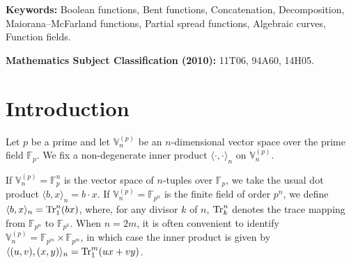 \documentclass[12pt]{article}
\theoremstyle{plain}
\theoremstyle{definition}
\newcommand{\V}{\mathbb{V}}
\newcommand{\Tr}{{\rm Tr}}
\begin{document}
	\begin{abstract}
		We study generalizations of two classical primary constructions of Boolean bent functions, namely the Maiorana--McFarland ($MM$) class and the (Desarguesian) partial spread ($\mathcal{PS}_{ap}$) class. 
		
		The construction of bent functions lying outside the completed $MM$ class has attracted considerable attention in recent years. 
		In this direction, we construct families of generalized Maiorana--McFarland bent functions that are not equivalent to any function in the classical $MM$ or $\mathcal{PS}_{ap}$ classes, and hence lie outside their completed classes.
		
		As a second contribution, we investigate the decomposition of generalized $\mathcal{PS}_{ap}$ functions. 
		We prove that when the degree is sufficiently small relative to the size of the underlying finite field, such functions do not, in general, admit a decomposition into bent or semibent functions. 
		Consequently, they cannot be obtained from known secondary constructions based on concatenation.
		
		Finally, we present a secondary construction of Boolean bent functions arising from the concatenation of components of vectorial generalized $\mathcal{PS}_{ap}$ functions.
		
		Our constructions and proofs rely on classical results concerning second-order derivatives of bent functions and their duals. In addition, we employ methods from the theory of algebraic curves and their function fields.
	\end{abstract}
	
	\noindent\textbf{Keywords:} Boolean functions, Bent functions, Concatenation, Decomposition, Maiorana--McFarland functions, Partial spread functions, Algebraic curves, Function fields.
	
	\medskip
	\noindent\textbf{Mathematics Subject Classification (2010):} 11T06, 94A60, 14H05.
	
	\section{Introduction}
	
	Let \(p\) be a prime and let \(\V_n^{(p)}\) be an \(n\)-dimensional vector space
	over the prime field \(\mathbb{F}_p\).
	We fix a non-degenerate inner product
	\(\langle \cdot , \cdot \rangle_n\) on \(\V_n^{(p)}\).
	
	If \(\V_n^{(p)} = \mathbb{F}_p^n\) is the vector space of \(n\)-tuples over
	\(\mathbb{F}_p\), we take the usual dot product \(\langle b, x \rangle_n = b \cdot x\).
	If \(\V_n^{(p)} = \mathbb{F}_{p^n}\) is the finite field of order $p^n$, we define $\langle b, x \rangle_n = \Tr_1^n(bx)$,
	where, for any divisor \(k\) of \(n\), \(\Tr_k^n\) denotes the trace mapping from
	\(\mathbb{F}_{p^n}\) to \(\mathbb{F}_{p^k}\).
	When \(n = 2m\), it is often convenient to identify
	\(\V_n^{(p)} =\mathbb{F}_{p^m} \times \mathbb{F}_{p^m}\), in which case the
	inner product is given by $\langle (u,v), (x,y) \rangle_n = \Tr_1^m(ux + vy)$.
	
\end{document}
